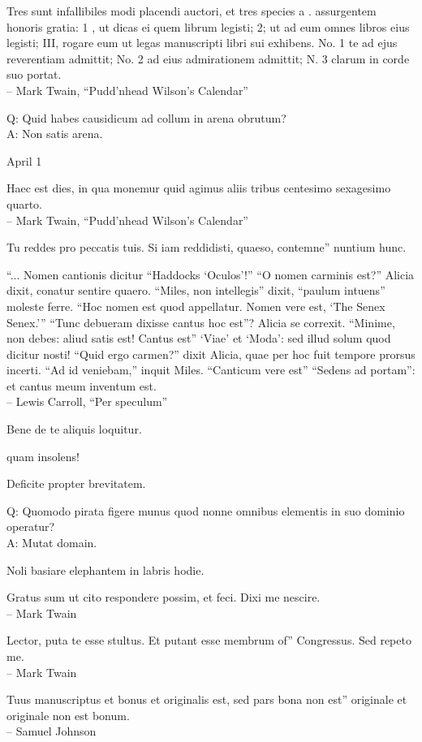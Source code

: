 \documentclass[titlepage,12pt]{memoir}
\begin{document}
Tres sunt infallibiles modi placendi auctori, et tres species a .
assurgentem honoris gratia: 1 , ut dicas ei quem librum legisti; 2;
ut ad eum omnes libros eius legisti; III, rogare eum ut legas
manuscripti libri sui exhibens. No. 1 te ad ejus reverentiam admittit; No. 2
ad eius admirationem admittit; N. 3 clarum in corde suo portat.
\\-- Mark Twain, “Pudd’nhead Wilson’s Calendar”

Q: Quid habes causidicum ad collum in arena obrutum?\\
A: Non satis arena.

April 1

Haec est dies, in qua monemur quid agimus aliis tribus
centesimo sexagesimo quarto.
\\-- Mark Twain, “Pudd’nhead Wilson’s Calendar”

Tu reddes pro peccatis tuis. Si iam reddidisti, quaeso, contemne”
nuntium hunc.

 “... Nomen cantionis dicitur “Haddocks ‘Oculos’!”
“O nomen carminis est?” Alicia dixit, conatur
sentire quaero.
“Miles, non intellegis” dixit, “paulum intuens”
moleste ferre. “Hoc nomen est quod appellatur. Nomen vere est, ‘The Senex
Senex.’”
“Tunc debueram dixisse cantus hoc est”?
Alicia se correxit.
“Minime, non debes: aliud satis est! Cantus est”
‘Viae’ et ‘Moda’: sed illud solum quod dicitur nosti!
“Quid ergo carmen?” dixit Alicia, quae per hoc fuit
tempore prorsus incerti.
“Ad id veniebam,” inquit Miles. “Canticum vere est”
“Sedens ad portam”: et cantus meum inventum est.
\\-- Lewis Carroll, “Per speculum”

 Bene de te aliquis loquitur.

quam insolens!

Deficite propter brevitatem.

Q: Quomodo pirata figere munus quod
nonne omnibus elementis in suo dominio operatur?\\
A: Mutat domain.

Noli basiare elephantem in labris hodie.

 Gratus sum ut cito respondere possim, et feci. Dixi me nescire.
\\-- Mark Twain

Lector, puta te esse stultus. Et putant esse membrum of”
Congressus. Sed repeto me.
\\-- Mark Twain

Tuus manuscriptus et bonus et originalis est, sed pars bona non est”
originale et originale non est bonum.
\\-- Samuel Johnson
\end{document}
